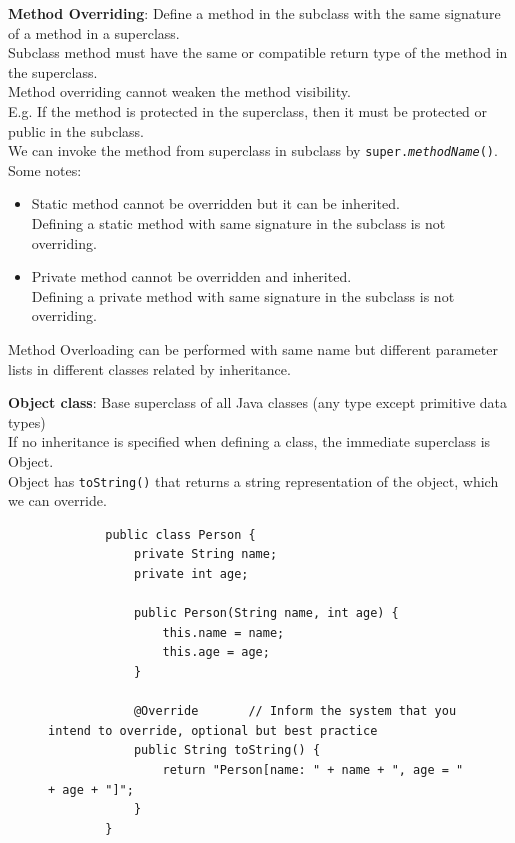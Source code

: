 \documentclass{article}
\begin{document}
\textbf{Method Overriding}: Define a method in the subclass with the same signature of a method in a superclass.\\
Subclass method must have the same or compatible return type of the method in the superclass.\\
Method overriding cannot weaken the method visibility.\\
E.g. If the method is protected in the superclass, then it must be protected or public in the subclass.\\
We can invoke the method from superclass in subclass by \texttt{super.\textit{methodName}()}.\\
Some notes:
\begin{itemize}
	\item Static method cannot be overridden but it can be inherited.\\
	Defining a static method with same signature in the subclass is not overriding.
	\item Private method cannot be overridden and inherited.\\
	Defining a private method with same signature in the subclass is not overriding.
\end{itemize}

Method Overloading can be performed with same name but different parameter lists in different classes related by inheritance.
\newpage

\textbf{Object class}: Base superclass of all Java classes (any type except primitive data types)\\
If no inheritance is specified when defining a class, the immediate superclass is Object.\\
Object has \texttt{toString()} that returns a string representation of the object, which we can override.

\begin{figure}[h]
	\begin{verbatim}
		public class Person {
		    private String name;
		    private int age;
		    
		    public Person(String name, int age) {
		        this.name = name;
		        this.age = age;
		    }
		    
		    @Override 		// Inform the system that you intend to override, optional but best practice
		    public String toString() {
		        return "Person[name: " + name + ", age = " + age + "]";
		    }
		}
	\end{verbatim}
\end{figure}
\end{document}
